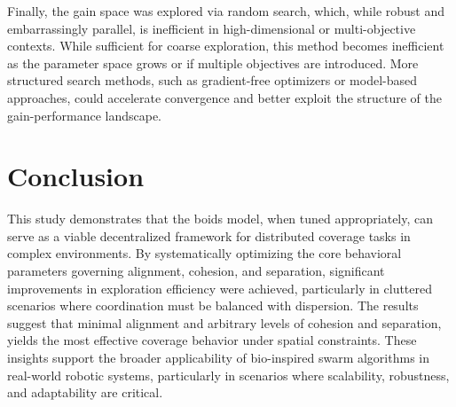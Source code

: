 \documentclass[12pt]{article}
\begin{document}
Finally, the gain space was explored via random search, which, while robust and embarrassingly parallel, is inefficient in high-dimensional or multi-objective contexts. While sufficient for coarse exploration, this method becomes inefficient as the parameter space grows or if multiple objectives are introduced. More structured search methods, such as gradient-free optimizers or model-based approaches, could accelerate convergence and better exploit the structure of the gain-performance landscape.

\section{Conclusion}

This study demonstrates that the boids model, when tuned appropriately, can serve as a viable decentralized framework for distributed coverage tasks in complex environments. By systematically optimizing the core behavioral parameters governing alignment, cohesion, and separation, significant improvements in exploration efficiency were achieved, particularly in cluttered scenarios where coordination must be balanced with dispersion. The results suggest that minimal alignment and arbitrary levels of cohesion and separation, yields the most effective coverage behavior under spatial constraints. These insights support the broader applicability of bio-inspired swarm algorithms in real-world robotic systems, particularly in scenarios where scalability, robustness, and adaptability are critical.



\appendix
\end{document}

